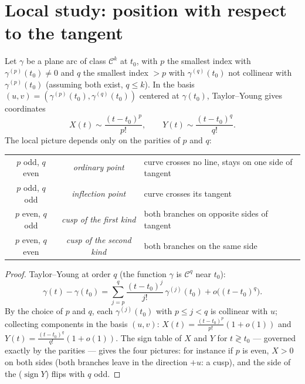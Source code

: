 \section{Local study: position with respect to the tangent}

\begin{proposition}\label{prop:b2:curves:local}
Let $\gamma$ be a plane arc of class $\mathcal{C}^k$ at $t_0$, with
$p$ the smallest index with $\gamma^{(p)}(t_0) \neq 0$ and $q$ the
smallest index $> p$ with $\gamma^{(q)}(t_0)$ not collinear with
$\gamma^{(p)}(t_0)$ (assuming both exist, $q \leq k$). In the basis
$(u, v) = (\gamma^{(p)}(t_0), \gamma^{(q)}(t_0))$ centered at
$\gamma(t_0)$, Taylor--Young gives coordinates
\[
X(t) \sim \frac{(t - t_0)^p}{p!},
\qquad
Y(t) \sim \frac{(t - t_0)^q}{q!} .
\]
The local picture depends only on the parities of $p$ and $q$:
\begin{center}
\begin{tabular}{c c l}
$p$ odd, $q$ even & \emph{ordinary point} & curve crosses no line,
stays on one side of tangent\\
$p$ odd, $q$ odd & \emph{inflection point} & curve crosses its
tangent\\
$p$ even, $q$ odd & \emph{cusp of the first kind} & both branches
on opposite sides of tangent\\
$p$ even, $q$ even & \emph{cusp of the second kind} & both
branches on the same side\\
\end{tabular}
\end{center}
\end{proposition}

\begin{proof}
Taylor--Young at order $q$ (the function $\gamma$ is
$\mathcal{C}^q$ near $t_0$):
\[
\gamma(t) - \gamma(t_0)
= \sum_{j=p}^{q} \frac{(t-t_0)^j}{j!}\,\gamma^{(j)}(t_0)
+ o\bigl((t-t_0)^q\bigr).
\]
By the choice of $p$ and $q$, each $\gamma^{(j)}(t_0)$ with $p
\leq j < q$ is collinear with $u$; collecting components in the
basis $(u, v)$: $X(t) = \frac{(t-t_0)^p}{p!}(1 + o(1))$ and
$Y(t) = \frac{(t-t_0)^q}{q!}(1 + o(1))$. The sign table of $X$ and
$Y$ for $t \gtrless t_0$ --- governed exactly by the parities ---
gives the four pictures: for instance if $p$ is even, $X > 0$ on
both sides (both branches leave in the direction $+u$: a cusp),
and the side of the  ($\operatorname{sign} Y$) flips
with $q$ odd.
\end{proof}

